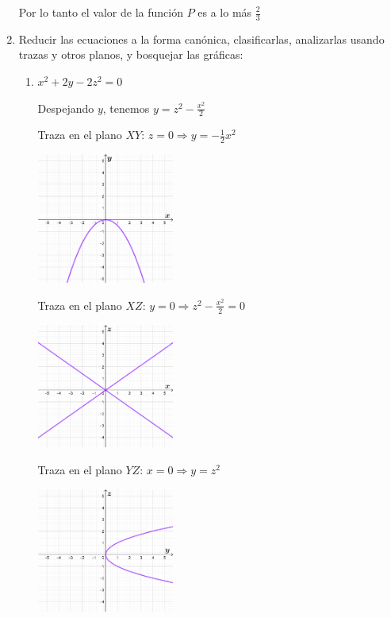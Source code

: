 \documentclass{article}
\begin{document}
\begin{enumerate}
{                Por lo tanto el valor de la función $P$ es a lo más $\frac{2}{3}$
            }
            \item {
                Reducir las ecuaciones a la forma canónica, clasificarlas, analizarlas
                usando trazas y otros planos, y bosquejar las gráficas:
                \begin{enumerate}
                    \item{
                        $x^2+2y-2z^2=0$
                        
                        \color{azul}
                        Despejando $y$, tenemos $\displaystyle y=z^2-\frac{x^2}{2}$
                        
                        Traza en el plano $XY$: $z=0 \Rightarrow y=-\frac{1}{2}x^2$
                        \begin{center}
                            \includegraphics[width=4.5cm]{img/7a1.png}
                        \end{center}
                        Traza en el plano $XZ$: $y=0 \Rightarrow z^2-\frac{x^2}{2}=0$
                        \begin{center}
                            \includegraphics[width=4.5cm]{img/7a2.png}
                        \end{center}
                        Traza en el plano $YZ$: $x=0 \Rightarrow y=z^2$
                        \begin{center}
                            \includegraphics[width=4.5cm]{img/7a3.png}

\end{center}}
\end{enumerate}}
\end{enumerate}
\end{document}
